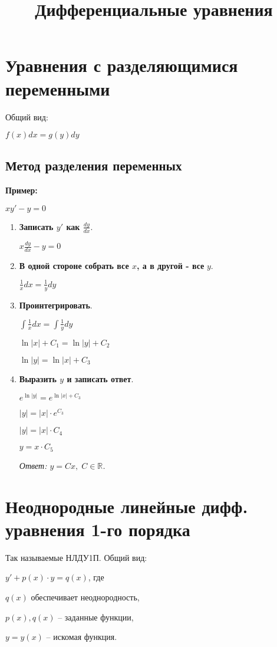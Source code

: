 \documentclass[10pt, a4paper]{article}
\title{Дифференциальные уравнения}
\author{}
\date{}
\begin{document}
\maketitle

\tableofcontents

\newpage

\section{Уравнения с разделяющимися переменными}
Общий вид:
\par $f(x)dx = g(y)dy$

\subsection{Метод разделения переменных}
\textbf{Пример:}
\par $xy' - y = 0$
\begin{enumerate}
    \item \textbf{Записать $y'$ как $\frac{dy}{dx}$}.
        \par $x\frac{dy}{dx} - y = 0$
    \item \textbf{В одной стороне собрать все $x$, а в другой - все} $y$.
        \par $\frac{1}{x}dx = \frac{1}{y}dy$
    \item \textbf{Проинтегрировать}.
        \par $\int\frac{1}{x}dx = \int\frac{1}{y}dy$
        \par $\ln|x| + C_{1} = \ln|y| + C_{2}$
        \par $\ln|y| = \ln|x| + C_{3}$
    \item \textbf{Выразить $y$ и записать ответ}.
        \par $e^{\ln|y|} = e^{\ln|x| + C_{3}}$
        \par $|y| = |x| \cdot e^{C_{3}}$
        \par $|y| = |x| \cdot C_{4}$
        \par $y = x \cdot C_{5}$
        \par \textit{Ответ: $y = Cx,\;C \in \mathbb{R}$.}
\end{enumerate}


\section{Неоднородные линейные дифф. уравнения 1-го порядка}
Так называемые НЛДУ1П.
\newline
Общий вид:
\par $y' + p(x) \cdot y = q(x)$, где
\par $q(x)$ обеспечивает неоднородность,
\par $p(x), q(x)$ -- заданные функции,
\par $y = y(x)$ -- искомая функция.
\end{document}
